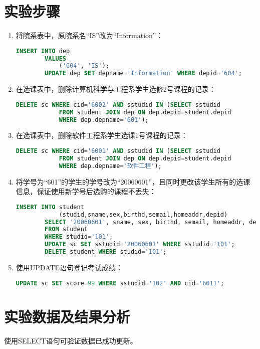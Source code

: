 \documentclass[a4paper]{uestcreport}
\begin{document}
\section{实验步骤}
\begin{enumerate}
    \item 将院系表中，原院系名“IS”改为“Information”：
          \begin{lstlisting}[language=SQL]
        INSERT INTO dep
        VALUES
            ('604', 'IS');
        UPDATE dep SET depname='Information' WHERE depid='604';
    \end{lstlisting}
    \item 在选课表中，删除计算机科学与工程系学生选修2号课程的记录：
          \begin{lstlisting}[language=SQL]
        DELETE sc WHERE cid='6002' AND sstudid IN (SELECT sstudid
            FROM student JOIN dep ON dep.depid=student.depid
            WHERE dep.depname='601');
    \end{lstlisting}
    \item 在选课表中，删除软件工程系学生选课1号课程的记录：
          \begin{lstlisting}[language=SQL]
        DELETE sc WHERE cid='6001' AND sstudid IN (SELECT sstudid
            FROM student JOIN dep ON dep.depid=student.depid
            WHERE dep.depname='软件工程');
    \end{lstlisting}
    \item 将学号为“601”的学生的学号改为“20060601”，且同时更改该学生所有的选课信息，保证使用新学号后选购的课程不丢失：
          \begin{lstlisting}[language=SQL]
        INSERT INTO student
            (studid,sname,sex,birthd,semail,homeaddr,depid)
        SELECT '20060601', sname, sex, birthd, semail, homeaddr, depid
        FROM student
        WHERE studid='101';
        UPDATE sc SET sstudid='20060601' WHERE sstudid='101';
        DELETE student WHERE studid='101';
    \end{lstlisting}
    \item 使用UPDATE语句登记考试成绩：
          \begin{lstlisting}[language=SQL]
        UPDATE sc SET score=99 WHERE sstudid='102' AND cid='6011';
    \end{lstlisting}
\end{enumerate}

\section{实验数据及结果分析}
使用SELECT语句可验证数据已成功更新。
\end{document}
